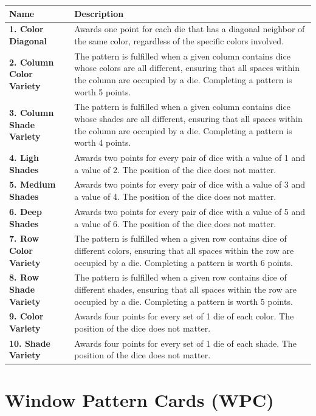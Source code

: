\begin{tabularx}{\textwidth}{>{\bfseries}l|X}
  Name & \textbf{Description} \\ 
  \hline
  1. Color Diagonal & Awards one point for each die that has a diagonal neighbor of the same color, regardless of the specific colors involved. \\  
  2. Column Color Variety &  The pattern is fulfilled when a given column contains dice whose colors are all different, ensuring that all spaces within the column are occupied by a die. Completing a pattern is worth 5 points.\\
  3. Column Shade Variety & The pattern is fulfilled when a given column contains dice whose shades are all different, ensuring that all spaces within the column are occupied by a die. Completing a pattern is worth 4 points.\\  
  4. Ligh Shades & Awards two points for every pair of dice with a value of 1 and a value of 2. The position of the dice does not matter.\\ 
  5. Medium Shades & Awards two points for every pair of dice with a value of 3 and a value of 4. The position of the dice does not matter.\\ 
  6. Deep Shades & Awards two points for every pair of dice with a value of 5 and a value of 6. The position of the dice does not matter.\\  
  7. Row Color Variety & The pattern is fulfilled when a given row contains dice of different colors, ensuring that all spaces within the row are occupied by a die. Completing a pattern is worth 6 points.\\
  8. Row Shade Variety & The pattern is fulfilled when a given row contains dice of different shades, ensuring that all spaces within the row are occupied by a die. Completing a pattern is worth 5 points.\\
  9. Color Variety & Awards four points for every set of 1 die of each color. The position of the dice does not matter.\\ 
  10. Shade Variety & Awards four points for every set of 1 die of each shade. The position of the dice does not matter.\\
 \end{tabularx}



\section{Window Pattern Cards (WPC)}

